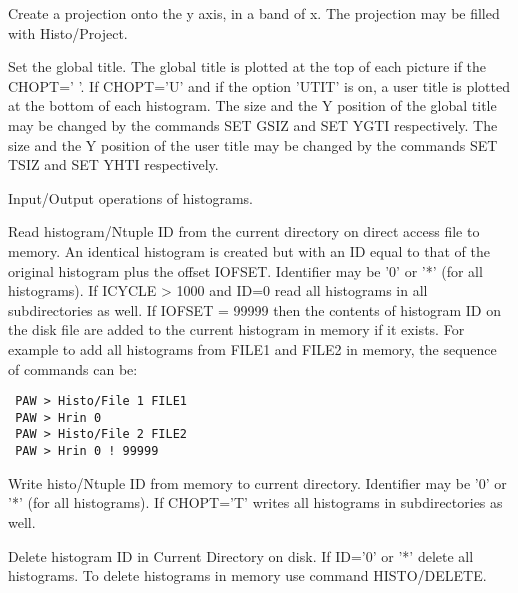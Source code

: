 \BEGARG
{}
\ENDARG
\BEGTEXT
Create a projection onto the y axis, in a band of x.
The projection may be filled with Histo/Project.
\ENDTEXT

\BEGARG
{}
\ENDARG
\BEGTEXT
Set the global title.
The global title is plotted at the top of each picture
if the CHOPT=' '. If CHOPT='U' and if the option 'UTIT' is on,
a user title is plotted at the bottom of each histogram.
The size and the Y position of the global title may be changed
by the commands SET GSIZ and SET YGTI respectively. The size and
the Y position of the user title may be changed by the commands
SET TSIZ and SET YHTI respectively.
\ENDTEXT


\BEGTEXT
Input/Output operations of histograms.
\ENDTEXT

\BEGARG
{}
\ENDARG
\BEGTEXT
Read histogram/Ntuple ID from the current directory
on direct access file to memory.
An identical histogram is created but with an ID equal to that
of the original histogram plus the offset IOFSET.
Identifier may be '0' or '*' (for all histograms).
If ICYCLE > 1000 and ID=0 read all histograms in all subdirectories as well.
If IOFSET = 99999 then the contents of histogram ID on the disk file
are added to the current histogram in memory if it exists. For example
to add all histograms from FILE1 and FILE2 in memory, the sequence
of commands can be:
\begin{verbatim}
 PAW > Histo/File 1 FILE1
 PAW > Hrin 0
 PAW > Histo/File 2 FILE2
 PAW > Hrin 0 ! 99999
\end{verbatim}
\ENDTEXT

\BEGARG
{}
\ENDARG
\BEGTEXT
Write histo/Ntuple ID from memory to current directory.
Identifier may be '0' or '*' (for all histograms).
If CHOPT='T' writes all histograms in subdirectories as well.
\ENDTEXT

\BEGARG
{}
\ENDARG
\BEGTEXT
Delete histogram ID in Current Directory on disk.
If ID='0' or '*' delete all histograms.
To delete histograms in memory use command HISTO/DELETE.
\ENDTEXT

